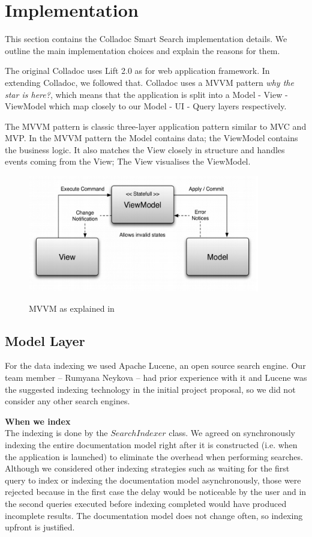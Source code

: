 \section{Implementation}\label{sec:implementation}
This section contains the Colladoc Smart Search implementation details. We outline the main implementation choices and explain the reasons for them. 

The original Colladoc uses Lift 2.0 as for web application framework. In extending Colladoc, we followed that. Colladoc uses a MVVM pattern \cite{lift} \emph{\color{red} why the star is here?}, which means that the application is split into a Model - View - ViewModel which map closely to our Model - UI - Query layers respectively.

The MVVM pattern is classic three-layer application pattern similar to MVC and MVP. In the MVVM pattern the Model contains data; the ViewModel contains the business logic. It also matches the View closely in structure and handles events coming from the View; The View visualises the ViewModel.
\begin{figure}[h!t]
\begin{center}
\leavevmode
{\includegraphics[width=0.9\textwidth]{mvvm}}
\end{center}
\caption{MVVM as explained in \cite{lift}}
\label{fig:mvvm}
\end{figure}

\subsection*{Model Layer}
For the data indexing we used Apache Lucene, an open source search engine. Our team member – Rumyana Neykova – had prior experience with it and Lucene was the suggested indexing technology in the initial project proposal, so we did not consider any other search engines.

\textbf{When we index}\\ 
The indexing is done by the $SearchIndexer$ class. We agreed on synchronously indexing the entire documentation model right after it is constructed (i.e. when the application is launched) to eliminate the overhead when performing searches. Although we considered other indexing strategies such as waiting for the first query to index or indexing the documentation model asynchronously, those were rejected because in the first case the delay would be noticeable by the user and in the second queries executed before indexing completed would have produced incomplete results. The documentation model does not change often, so indexing upfront is justified.

